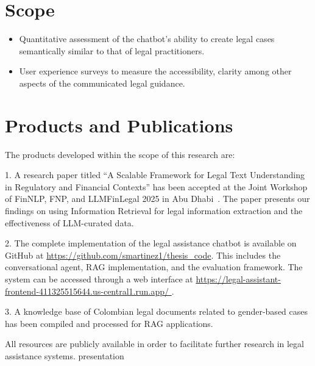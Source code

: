 \section{Scope}
\begin{itemize}
    \item Quantitative assessment of the chatbot's ability to create legal cases semantically similar to that of legal practitioners.
    \item User experience surveys to measure the accessibility, clarity among other aspects of the communicated legal guidance.
\end{itemize}

\section{Products and Publications}
The products developed within the scope of this research are:

1. A research paper titled ``A Scalable Framework for Legal Text Understanding in Regulatory and Financial Contexts'' has been accepted at the Joint Workshop of FinNLP, FNP, and LLMFinLegal 2025 in Abu Dhabi~\cite{martinez-etal-2025-scalable}. 
The paper presents our findings on using Information Retrieval for legal information extraction and the effectiveness of LLM-curated data.

2. The complete implementation of the legal assistance chatbot is available on GitHub at 
\url{https://github.com/smartinez1/thesis_code}. This includes the conversational agent, RAG implementation, 
and the evaluation framework. The system can be accessed through a web interface at \url{https://legal-assistant-frontend-411325515644.us-central1.run.app/ }.

3. A knowledge base of Colombian legal documents related to gender-based cases has been compiled and processed for RAG applications.

All resources are publicly available in order to facilitate further research in legal assistance systems.
presentation
\endinput